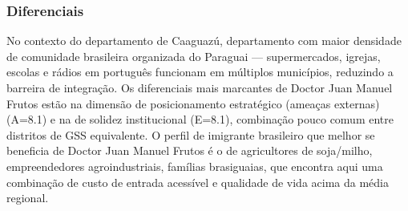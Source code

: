 \subsubsection*{Diferenciais}\label{dif-doctor-juan-manuel-frutos-0513}
No contexto do departamento de Caaguazú, departamento com maior densidade de comunidade brasileira organizada do Paraguai — supermercados, igrejas, escolas e rádios em português funcionam em múltiplos municípios, reduzindo a barreira de integração. Os diferenciais mais marcantes de Doctor Juan Manuel Frutos estão na dimensão de posicionamento estratégico (ameaças externas) (A=8.1) e na de solidez institucional (E=8.1), combinação pouco comum entre distritos de GSS equivalente. O perfil de imigrante brasileiro que melhor se beneficia de Doctor Juan Manuel Frutos é o de agricultores de soja/milho, empreendedores agroindustriais, famílias brasiguaias, que encontra aqui uma combinação de custo de entrada acessível e qualidade de vida acima da média regional.
